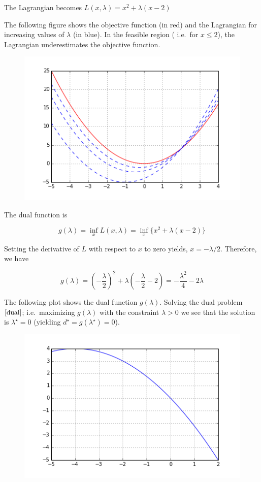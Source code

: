 The Lagrangian becomes $L(x,\lambda) = x^2 + \lambda (x-2)$

The following figure shows the objective function (in red) and the
Lagrangian for increasing values of $\lambda$ (in blue). In the feasible region ( i.e.~for $x\leq 2$), the Lagrangian underestimates the objective function.

\begin{figure}[H]
\includegraphics[scale=0.7]{images/convex_opt_03.png}
\end{figure}

The dual function is

\[
g(\lambda) = \inf_x L(x, \lambda) = \inf_x \big\{ x^2 + \lambda (x-2) \big\}
\]

Setting the derivative of $L$ with respect to $x$ to zero yields, $x=-\lambda/2$. Therefore, we have

\[
g(\lambda) = \left(-\frac{\lambda}{2}\right)^2 + \lambda \left( -\frac{\lambda}{2} - 2 \right) = - \frac{\lambda^2}{4} - 2\lambda
\]

The following plot shows the dual function $g(\lambda)$. Solving the dual problem $\eqref{dual}$; i.e.~maximizing $g(\lambda)$ with the constraint $\lambda > 0$ we see that the solution is $\lambda^\star = 0$ (yielding $d^\star = g(\lambda^\star)=0$).

\begin{figure}[H]
\includegraphics[scale=0.7]{images/convex_opt_03a.png}
\end{figure}

